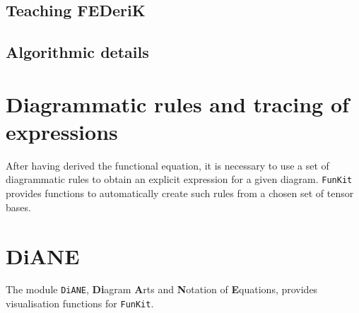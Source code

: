 \documentclass[10pt,prd,nofootinbib,superscriptaddress,twocolumn]{revtex4-2}
\newcommand{\FunKit}{\texttt{FunKit}\xspace}
\newcommand{\DiANE}{\texttt{DiANE}\xspace}
\begin{document}
\subsection{Teaching FEDeriK}
\label{sec:FEDeriK_teaching}

\subsection{Algorithmic details}
\label{sec:FEDeriK_algorithm}



\section{Diagrammatic rules and tracing of expressions}
\label{sec:AnSEL}

After having derived the functional equation, it is necessary to use a set of diagrammatic rules to obtain an explicit expression for a given diagram. \FunKit provides functions to automatically create such rules from a chosen set of tensor bases.


\clearpage
\section{D\MakeLowercase{i}ANE}
\label{sec:DiANE}

The module \DiANE, \textbf{Di}agram \textbf{A}rts and \textbf{N}otation of \textbf{E}quations, provides visualisation functions for \FunKit. 
\end{document}
